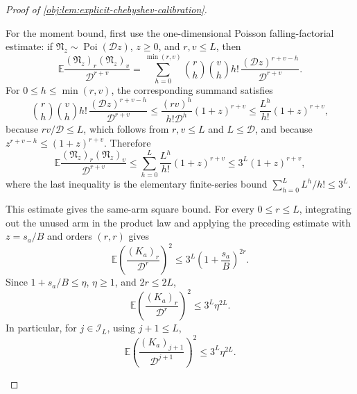 \begin{proof}[Proof of \cref{obj:lem:explicit-chebyshev-calibration}]
\begin{enumerate}
For the moment bound, first use the one-dimensional Poisson falling-factorial estimate: if
\(\mathfrak N_z\sim\operatorname{Poi}(\mathscr D z)\), \(z\ge0\), and \(r,v\le L\), then
\[
\mathbb E\frac{(\mathfrak N_z)_r(\mathfrak N_z)_v}{\mathscr D^{r+v}}
=
\sum_{h=0}^{\min(r,v)}
\binom rh\binom vh h!\,
\frac{(\mathscr D z)^{r+v-h}}{\mathscr D^{r+v}}.
\]
For \(0\le h\le\min(r,v)\), the corresponding summand satisfies
\[
\binom rh\binom vh h!\,
\frac{(\mathscr D z)^{r+v-h}}{\mathscr D^{r+v}}
\le
\frac{(rv)^h}{h!\mathscr D^h}(1+z)^{r+v}
\le
\frac{L^h}{h!}(1+z)^{r+v},
\]
because \(rv/\mathscr D\le L\), which follows from \(r,v\le L\) and \(L\le\mathscr D\), and because \(z^{r+v-h}\le(1+z)^{r+v}\). Therefore
\[
\mathbb E\frac{(\mathfrak N_z)_r(\mathfrak N_z)_v}{\mathscr D^{r+v}}
\le
\sum_{h=0}^{L}\frac{L^h}{h!}(1+z)^{r+v}
\le
3^L(1+z)^{r+v},
\]
where the last inequality is the elementary finite-series bound \(\sum_{h=0}^L L^h/h!\le3^L\).

This estimate gives the same-arm square bound. For every \(0\le r\le L\), integrating out the unused arm in the product law and applying the preceding estimate with \(z=s_a/B\) and orders \((r,r)\) gives
\[
\mathbb E\left(\frac{(K_a)_r}{\mathscr D^r}\right)^2
\le
3^L\left(1+\frac{s_a}{B}\right)^{2r}.
\]
Since \(1+s_a/B\le\eta\), \(\eta\ge1\), and \(2r\le2L\),
\[
\mathbb E\left(\frac{(K_a)_r}{\mathscr D^r}\right)^2
\le 3^L\eta^{2L}.
\]
In particular, for \(j\in\mathscr I_L\), using \(j+1\le L\),
\[
\mathbb E\left(\frac{(K_a)_{j+1}}{\mathscr D^{j+1}}\right)^2
\le
3^L\eta^{2L}.
\]


\end{enumerate}
\end{proof}
